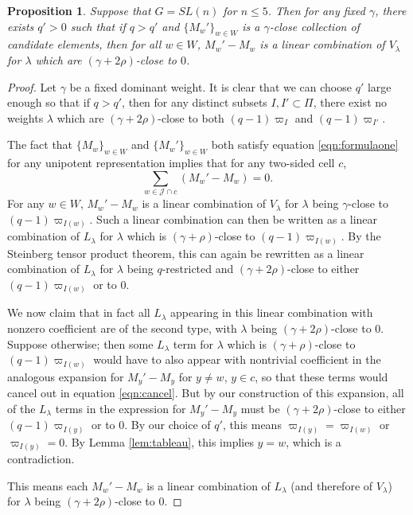 \documentclass{amsart}
\newtheorem{prop}[thm]{Proposition}
\theoremstyle{definition}
\begin{document}
\begin{prop}\label{prop:uniqueness}
    Suppose that $G = SL(n)$ for $n \leq 5$. Then for any fixed $\gamma$, there exists $q' > 0$ such that if $q > q'$ and $\{M_w'\}_{w \in W}$ is a $\gamma$-close collection of candidate elements, then for all $w \in W$, $M_w' - M_w$ is a linear combination of $V_\lambda$ for $\lambda$ which are $(\gamma + 2\rho)$-close to $0$.
\end{prop}
\begin{proof}
    Let $\gamma$ be a fixed dominant weight. It is clear that we can choose $q'$ large enough so that if $q > q'$, then for any distinct subsets $I, I' \subset \Pi$, there exist no weights $\lambda$ which are $(\gamma + 2\rho)$-close to both $(q-1)\varpi_{I}$ and $(q-1)\varpi_{I'}$.

    The fact that $\{M_w\}_{w \in W}$ and $\{M_w'\}_{w \in W}$ both satisfy equation \eqref{eqn:formulaone} for any unipotent representation implies that for any two-sided cell $c$,
    \begin{equation}\label{eqn:cancel}
        \sum_{w \in \mathcal{J} \cap c} (M_w' - M_w) = 0.
    \end{equation}
    For any $w \in W$, $M_w' - M_w$ is a linear combination of $V_{\lambda}$ for $\lambda$ being $\gamma$-close to $(q-1)\varpi_{I(w)}$. Such a linear combination can then be written as a linear combination of $L_{\lambda}$ for $\lambda$ which is $(\gamma + \rho)$-close to $(q-1)\varpi_{I(w)}$. By the Steinberg tensor product theorem, this can again be rewritten as a linear combination of $L_{\lambda}$ for $\lambda$ being $q$-restricted and $(\gamma + 2\rho)$-close to either $(q-1)\varpi_{I(w)}$ or to $0$.

    We now claim that in fact all $L_\lambda$ appearing in this linear combination with nonzero coefficient are of the second type, with $\lambda$ being $(\gamma + 2\rho)$-close to $0$. Suppose otherwise; then some $L_{\lambda}$ term for $\lambda$ which is $(\gamma + \rho)$-close to $(q-1)\varpi_{I(w)}$ would have to also appear with nontrivial coefficient in the analogous expansion for $M_y' - M_y$ for $y \neq w$, $y \in c$, so that these terms would cancel out in equation \eqref{eqn:cancel}. But by our construction of this expansion, all of the $L_{\lambda}$ terms in the expression for $M_y' - M_y$ must be $(\gamma + 2\rho)$-close to either $(q-1)\varpi_{I(y)}$ or to $0$. By our choice of $q'$, this means $\varpi_{I(y)} = \varpi_{I(w)}$ or $\varpi_{I(y)} = 0$. By Lemma \ref{lem:tableau}, this implies $y = w$, which is a contradiction.

    This means each $M_w' - M_w$ is a linear combination of $L_\lambda$ (and therefore of $V_{\lambda}$) for $\lambda$ being $(\gamma + 2\rho)$-close to $0$.
\end{proof}
\end{document}
